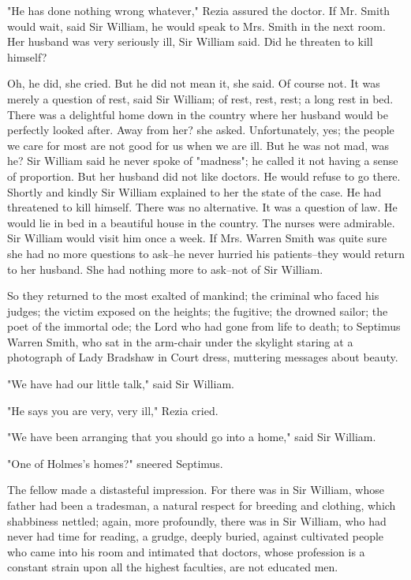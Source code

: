 \documentclass[lang=cn,10pt]{elegantbook}
\begin{document}
"He has done nothing wrong whatever," Rezia assured the doctor.  If
Mr. Smith would wait, said Sir William, he would speak to Mrs.
Smith in the next room.  Her husband was very seriously ill, Sir
William said.  Did he threaten to kill himself?

Oh, he did, she cried.  But he did not mean it, she said.  Of
course not.  It was merely a question of rest, said Sir William; of
rest, rest, rest; a long rest in bed.  There was a delightful home
down in the country where her husband would be perfectly looked
after.  Away from her? she asked.  Unfortunately, yes; the people
we care for most are not good for us when we are ill.  But he was
not mad, was he?  Sir William said he never spoke of "madness"; he
called it not having a sense of proportion.  But her husband did
not like doctors.  He would refuse to go there.  Shortly and kindly
Sir William explained to her the state of the case.  He had
threatened to kill himself.  There was no alternative.  It was a
question of law.  He would lie in bed in a beautiful house in the
country.  The nurses were admirable.  Sir William would visit him
once a week.  If Mrs. Warren Smith was quite sure she had no more
questions to ask--he never hurried his patients--they would return
to her husband.  She had nothing more to ask--not of Sir William.

So they returned to the most exalted of mankind; the criminal who
faced his judges; the victim exposed on the heights; the fugitive;
the drowned sailor; the poet of the immortal ode; the Lord who had
gone from life to death; to Septimus Warren Smith, who sat in the
arm-chair under the skylight staring at a photograph of Lady
Bradshaw in Court dress, muttering messages about beauty.

"We have had our little talk," said Sir William.

"He says you are very, very ill," Rezia cried.

"We have been arranging that you should go into a home," said Sir
William.

"One of Holmes's homes?" sneered Septimus.

The fellow made a distasteful impression.  For there was in Sir
William, whose father had been a tradesman, a natural respect for
breeding and clothing, which shabbiness nettled; again, more
profoundly, there was in Sir William, who had never had time for
reading, a grudge, deeply buried, against cultivated people who
came into his room and intimated that doctors, whose profession is
a constant strain upon all the highest faculties, are not educated
men.
\end{document}
